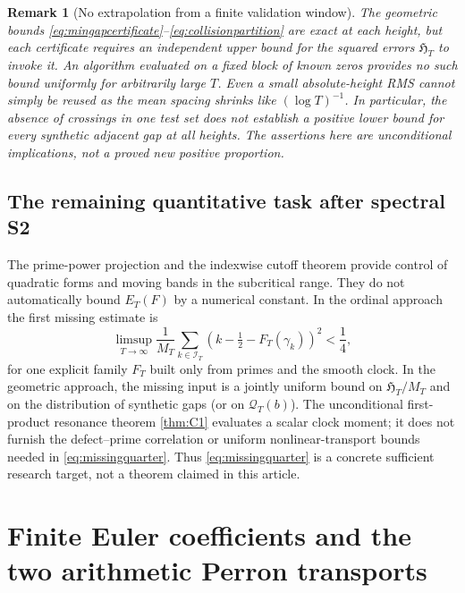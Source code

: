 \documentclass[11pt,reqno]{amsart}
\numberwithin{equation}{section}
\newtheorem{remark}[theorem]{Remark}
\begin{document}
\begin{remark}[No extrapolation from a finite validation window]
\label{rem:finitegeometric}
The geometric bounds \eqref{eq:mingapcertificate}--\eqref{eq:collisionpartition}
are exact at each height, but each certificate requires an
\emph{independent} upper bound for the squared errors $\mathfrak H_T$
to invoke it.  An algorithm evaluated on a fixed block of known zeros
provides no such bound uniformly for arbitrarily large $T$.  Even a
small absolute-height RMS cannot simply be reused as the mean spacing
shrinks like $(\log T)^{-1}$.  In particular, the absence of crossings
in one test set does not establish a positive lower bound for every
synthetic adjacent gap at all heights.  The assertions here are
unconditional \emph{implications}, not a proved new positive proportion.
\end{remark}

\subsection{The remaining quantitative task after spectral S2}
\label{subsec:blockbridge}
The prime-power projection and the indexwise cutoff theorem provide
control of quadratic forms and moving bands in the subcritical range.
They do not automatically bound $E_T(F)$ by a numerical constant.
In the ordinal approach the first missing estimate is
\begin{equation}\label{eq:missingquarter}
 \limsup_{T\to\infty}\frac1{M_T}
 \sum_{k\in\mathcal I_T}
 \left(k-\tfrac12-F_T(\gamma_k)\right)^2<\frac14,
\end{equation}
for one explicit family $F_T$ built only from primes and the smooth
clock.  In the geometric approach, the missing input is a jointly
uniform bound on $\mathfrak H_T/M_T$ and on the distribution of
synthetic gaps (or on $\mathcal Q_T(b)$). The unconditional
first-product resonance theorem \cref{thm:C1} evaluates a scalar
clock moment; it does not furnish the defect--prime correlation or
uniform nonlinear-transport bounds needed in \eqref{eq:missingquarter}.
Thus \eqref{eq:missingquarter} is a concrete sufficient research target,
not a theorem claimed in this article.


\section{Finite Euler coefficients and the two arithmetic Perron transports}
\label{sec:finiteeulertransports}
\end{document}
